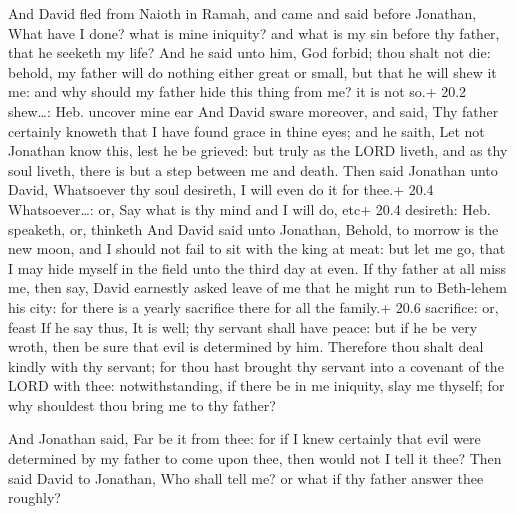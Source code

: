 And David fled from Naioth in Ramah, and came and said
before Jonathan, What have I done? what is mine iniquity? and what is my
sin before thy father, that he seeketh my life?  And he said
unto him, God forbid; thou shalt not die: behold, my father will do
nothing either great or small, but that he will shew it me: and why
should my father hide this thing from me? it is not so.+ 20.2
shew\ldots: Heb. uncover mine ear  And David sware moreover,
and said, Thy father certainly knoweth that I have found grace in thine
eyes; and he saith, Let not Jonathan know this, lest he be grieved: but
truly as the LORD liveth, and as thy soul liveth, there is but a step
between me and death.  Then said Jonathan unto David,
Whatsoever thy soul desireth, I will even do it for thee.+ 20.4
Whatsoever\ldots: or, Say what is thy mind and I will do, etc+ 20.4
desireth: Heb. speaketh, or, thinketh  And David said unto
Jonathan, Behold, to morrow is the new moon, and I should not fail to
sit with the king at meat: but let me go, that I may hide myself in the
field unto the third day at even.  If thy father at all miss
me, then say, David earnestly asked leave of me that he might run to
Beth-lehem his city: for there is a yearly sacrifice there for all the
family.+ 20.6 sacrifice: or, feast  If he say thus, It is
well; thy servant shall have peace: but if he be very wroth, then be
sure that evil is determined by him.  Therefore thou shalt
deal kindly with thy servant; for thou hast brought thy servant into a
covenant of the LORD with thee: notwithstanding, if there be in me
iniquity, slay me thyself; for why shouldest thou bring me to thy
father?

 And Jonathan said, Far be it from thee: for if I knew
certainly that evil were determined by my father to come upon thee, then
would not I tell it thee?  Then said David to Jonathan, Who
shall tell me? or what if thy father answer thee roughly?

